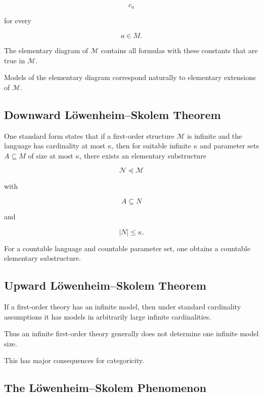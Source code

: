 \[
c_a
\]

for every

\[
a\in M.
\]

The elementary diagram of \(\mathcal{M}\) contains all formulas with these
constants that are true in \(\mathcal{M}\).

Models of the elementary diagram correspond naturally to elementary
extensions of \(\mathcal{M}\).

\subsection{Downward Löwenheim--Skolem Theorem}
\label{subsec:downward-lowenheim-skolem}

One standard form states that if a first-order structure \(\mathcal{M}\)
is infinite and the language has cardinality at most \(\kappa\), then for
suitable infinite \(\kappa\) and parameter sets \(A\subseteq M\) of size at
most \(\kappa\), there exists an elementary substructure

\[
\mathcal{N}
\preccurlyeq
\mathcal{M}
\]

with

\[
A\subseteq N
\]

and

\[
\boxed{
|N|
\leq
\kappa.
}
\]

For a countable language and countable parameter set, one obtains a
countable elementary substructure.

\subsection{Upward Löwenheim--Skolem Theorem}
\label{subsec:upward-lowenheim-skolem}

If a first-order theory has an infinite model, then under standard
cardinality assumptions it has models in arbitrarily large infinite
cardinalities.

Thus an infinite first-order theory generally does not determine one
infinite model size.

This has major consequences for categoricity.

\subsection{The Löwenheim--Skolem Phenomenon}
\label{subsec:lowenheim-skolem-phenomenon}

